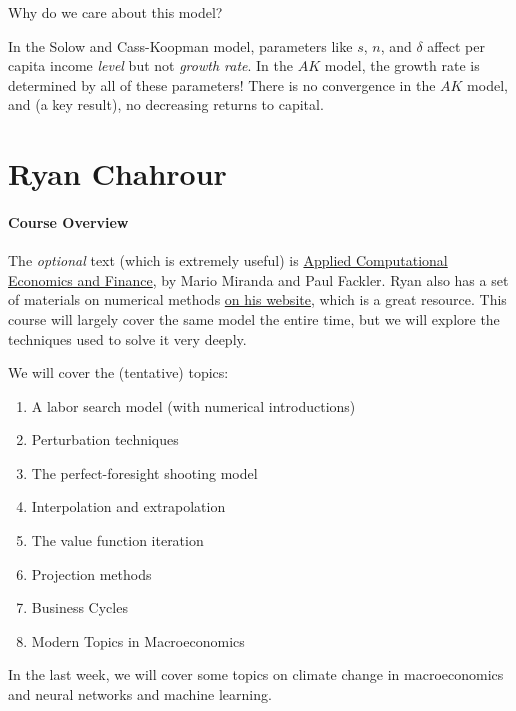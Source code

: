\documentclass[10pt]{article}
\begin{document}
\begin{question}
	Why do we care about this model?
\end{question}

\begin{answer}
	In the Solow and Cass-Koopman model, parameters like $s$, $n$, and $\delta$ affect per capita income \emph{level} but not \emph{growth rate}. In the $AK$ model, the growth rate is determined by all of these parameters! There is no convergence in the $AK$ model, and (a key result), no decreasing returns to capital.
\end{answer}


\newpage

\section{Ryan Chahrour}

\paragraph{Course Overview} The \emph{optional} text (which is extremely useful) is \href{https://mitpress.mit.edu/9780262633093/applied-computational-economics-and-finance/}{Applied Computational Economics and Finance}, by Mario Miranda and Paul Fackler. Ryan also has a set of materials on numerical methods \href{https://www.chahrour.net/teaching/numerical-methods-for-economists}{on his website}, which is a great resource. This course will largely cover the same model the entire time, but we will explore the techniques used to solve it very deeply.

We will cover the (tentative) topics:
\begin{enumerate}
	\item A labor search model (with numerical introductions)
	\item Perturbation techniques
	\item The perfect-foresight shooting model
	\item Interpolation and extrapolation
	\item The value function iteration
	\item Projection methods
	\item Business Cycles
	\item Modern Topics in Macroeconomics
\end{enumerate}

In the last week, we will cover some topics on climate change in macroeconomics and neural networks and machine learning.
\end{document}
